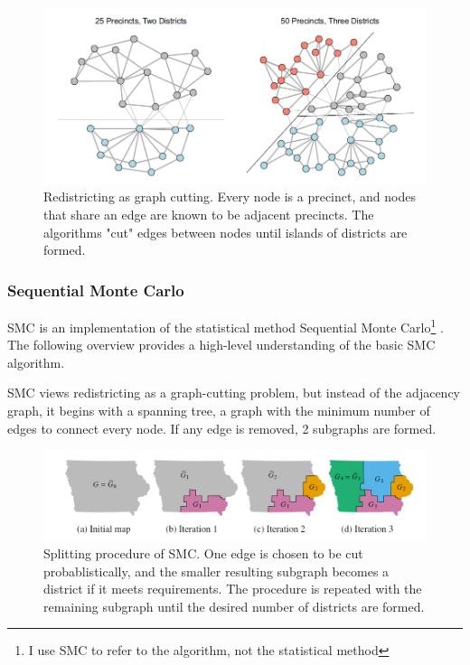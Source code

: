 \begin{figure}
    \centering
    \includegraphics[width=\linewidth]{img/graphcut.png}
    \caption{Redistricting as graph cutting. Every node is a precinct, and nodes that share an edge are known to be adjacent precincts. The algorithms "cut" edges between nodes until islands of districts are formed. \parencite
    [3]{fifield2020}}
    \label{fig:graphcut}
\end{figure} 

\subsubsection{Sequential Monte Carlo}
\label{sec:smc}

SMC is an implementation of the statistical method Sequential Monte Carlo\footnote{I use SMC to refer to the algorithm, not the statistical method} \parencite{mccartan2020}. The following overview provides a high-level understanding of the basic SMC algorithm.

SMC views redistricting as a graph-cutting problem, but instead of the adjacency graph, it begins with a spanning tree, a graph with the minimum number of edges to connect every node. If any edge is removed, 2 subgraphs are formed. 

\begin{figure}
    \centering
    \includegraphics[width=\linewidth]{img/smc.PNG}
    \caption{Splitting procedure of SMC. One edge is chosen to be cut probablistically, and the smaller resulting subgraph becomes a district if it meets requirements. The procedure is repeated with the remaining subgraph until the desired number of districts are formed. \parencite[14]{mccartan2020}}
    \label{fig:smc}
\end{figure}

